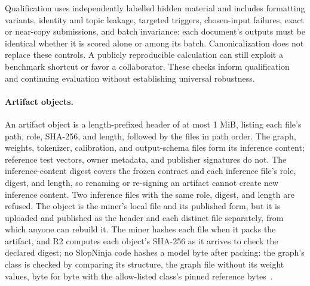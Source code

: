 Qualification uses independently labelled hidden material and includes
formatting variants, identity and topic leakage, targeted triggers, chosen-input
failures, exact or near-copy submissions, and batch invariance: each document's
outputs must be identical whether it is scored alone or among its batch. Canonicalization does not replace
these controls. A publicly reproducible calculation can still exploit a
benchmark shortcut or favor a collaborator. These checks inform qualification
and continuing evaluation without establishing universal robustness.

\paragraph{Artifact objects.}
An artifact object is a length-prefixed header of at most 1 MiB, listing each
file's path, role, SHA-256, and length, followed by the files in path order.
The graph, weights, tokenizer, calibration, and output-schema files form its
inference content; reference test vectors, owner metadata, and publisher
signatures do not. The inference-content digest covers the frozen contract and
each inference file's role, digest, and length, so renaming or re-signing an
artifact cannot create new inference content. Two inference files with the same
role, digest, and length are refused. The object is the miner's local file and
its published form, but it is uploaded and published as the header and each
distinct file separately, from which anyone can rebuild it. The miner hashes
each file when it packs the artifact, and R2 computes each object's SHA-256 as it
arrives to check the declared digest; no SlopNinja code hashes a model byte
after packing: the graph's class is checked by comparing its structure, the graph
file without its weight values, byte for byte with the allow-listed class's
pinned reference bytes~\cite{artifactspec}.

